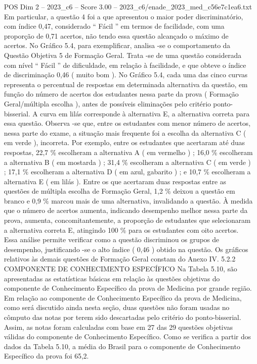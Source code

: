 \begin{textsample}{POS Dim 2 – 2023\_c6 – Score 3.00 – 2023\_c6/enade\_2023\_med\_c56e7c1ea6.txt}
Em particular, a questão 4 foi a que apresentou o maior poder discriminatório, com índice 0,47, considerado “ Fácil ” em termos de facilidade, com uma proporção de 0,71 acertos, não tendo essa questão alcançado o máximo de acertos.
No Gráfico 5.4, para exemplificar, analisa -se o comportamento da Questão Objetiva 5 de Formação Geral.
Trata -se de uma questão considerada com nível “ Fácil ” de dificuldade, em relação à facilidade, e que obteve o índice de discriminação 0,46 ( muito bom ).
No Gráfico 5.4, cada uma das cinco curvas representa o percentual de respostas em determinada alternativa da questão, em função do número de acertos dos estudantes nessa parte da prova ( Formação Geral/múltipla escolha ), antes de possíveis eliminações pelo critério ponto-bisserial.
A curva em lilás corresponde à alternativa E, a alternativa correta para essa questão.
Observa -se que, entre os estudantes com menor número de acertos, nessa parte do exame, a situação mais frequente foi a escolha da alternativa C ( em verde ), incorreta.
Por exemplo, entre os estudantes que acertaram até duas respostas, 22,7 \% escolheram a alternativa A ( em vermelho ) ; 16,0 \% escolheram a alternativa B ( em mostarda ) ; 31,4 \% escolheram a alternativa C ( em verde ) ; 17,1 \% escolheram a alternativa D ( em azul, gabarito ) ; e 10,7 \% escolheram a alternativa E ( em lilás ).
Entre os que acertaram duas respostas entre as questões de múltipla escolha de Formação Geral, 1,2 \% deixou a questão em branco e 0,9 \% marcou mais de uma alternativa, invalidando a questão.
À medida que o número de acertos aumenta, indicando desempenho melhor nessa parte da prova, aumenta, concomitantemente, a proporção de estudantes que selecionaram a alternativa correta E, atingindo 100 \% para os estudantes com oito acertos.
Essa análise permite verificar como a questão discriminou os grupos de desempenho, justificando -se o alto índice ( 0,46 ) obtido na questão.
Os gráficos relativos às demais questões de Formação Geral constam do Anexo IV. 5.2.2 COMPONENTE DE CONHECIMENTO ESPECÍFICO Na Tabela 5.10, são apresentadas as estatísticas básicas em relação às questões objetivas do componente de Conhecimento Específico da prova de Medicina por grande região.
Em relação ao componente de Conhecimento Específico da prova de Medicina, como será discutido ainda nesta seção, duas questões não foram usadas no cômputo das notas por terem sido descartadas pelo critério do ponto-bisserial.
Assim, as notas foram calculadas com base em 27 das 29 questões objetivas válidas do componente de Conhecimento Específico.
Como se verifica a partir dos dados da Tabela 5.10, a média do Brasil para o componente de Conhecimento Específico da prova foi 65,2.

\end{textsample}
